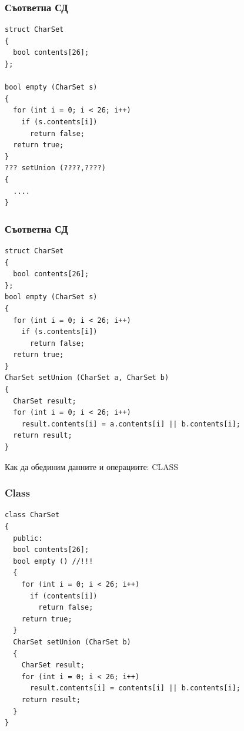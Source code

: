 \documentclass{beamer}
\begin{document}
\begin{frame}[fragile]
\frametitle{Съответна СД}


\begin{flushleft}
\begin{lstlisting}
struct CharSet
{
  bool contents[26];
};

bool empty (CharSet s)
{
  for (int i = 0; i < 26; i++)
    if (s.contents[i])
      return false;
  return true;
}
??? setUnion (????,????)
{
  ....
}
\end{lstlisting}  
\end{flushleft}


\end{frame}

\begin{frame}[fragile]
\frametitle{Съответна СД}


\begin{flushleft}
\begin{lstlisting}
struct CharSet
{
  bool contents[26];
};
bool empty (CharSet s)
{
  for (int i = 0; i < 26; i++)
    if (s.contents[i])
      return false;
  return true;
}
CharSet setUnion (CharSet a, CharSet b)
{
  CharSet result;
  for (int i = 0; i < 26; i++)
    result.contents[i] = a.contents[i] || b.contents[i];
  return result;
}
\end{lstlisting}  
\end{flushleft}


\end{frame}


\begin{frame}
\centerline{Как да обединим данните и операциите: CLASS}
\end{frame}



\begin{frame}[fragile]
\frametitle{Class}


\begin{flushleft}
\begin{lstlisting}
class CharSet
{
  public:
  bool contents[26];
  bool empty () //!!!
  {
    for (int i = 0; i < 26; i++)
      if (contents[i])
        return false;
    return true;
  }
  CharSet setUnion (CharSet b)
  {
    CharSet result;
    for (int i = 0; i < 26; i++)
      result.contents[i] = contents[i] || b.contents[i];
    return result;
  }
}
\end{lstlisting}  
\end{flushleft}


\end{frame}
\end{document}
